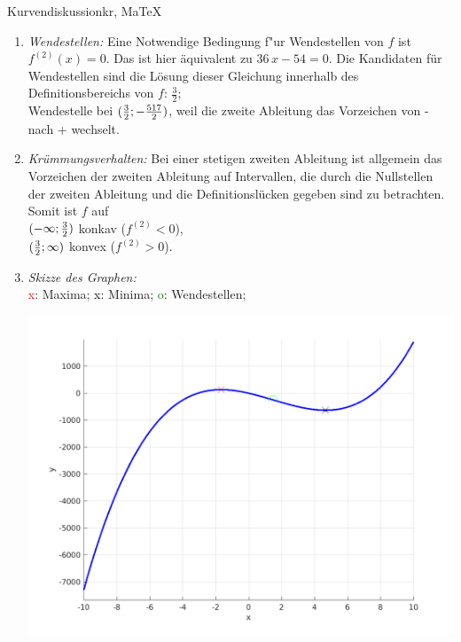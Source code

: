 \begin{MAufgabe}{Kurvendiskussion}{kr, MaTeX}
\begin{enumerate}
 $\MoIl-\infty\MIntvlSep- \frac{5}{3}\MoIr$ monoton wachsend, \\ 
 $\MoIl- \frac{5}{3}\MIntvlSep\frac{14}{3}\MoIr$ monoton  fallend, \\ 
 $\MoIl\frac{14}{3}\MIntvlSep \infty\MoIr$ monoton wachsend. \\ 
 \item \emph{Wendestellen:} 
 Eine Notwendige Bedingung f"ur Wendestellen von $f$ ist $f^{(2)}(x)=0$. 
 Das ist hier \"aquivalent zu $36\, x - 54=0$. 
 Die Kandidaten f\"ur Wendestellen sind die L\"osung dieser Gleichung innerhalb des Definitionsbereichs von $f$: $\frac{3}{2}$; \\ 
 Wendestelle bei $(\frac{3}{2};- \frac{517}{2})$, weil die zweite Ableitung das Vorzeichen von - nach + wechselt. \\ 
 \item \emph{Kr\"ummungsverhalten:} 
 Bei einer stetigen zweiten Ableitung ist allgemein das Vorzeichen der zweiten Ableitung auf Intervallen, die durch die Nullstellen der zweiten Ableitung und die Definitionsl\"ucken gegeben sind zu betrachten. 
 Somit ist $f$ auf \\ 
 $(-\infty ;\frac{3}{2})$  konkav ($f^{(2)}<0$), \\ 
 $(\frac{3}{2}; \infty)$  konvex ($f^{(2)}>0$). \\ 
 \item \emph{Skizze des Graphen:} \\ 
 {\textcolor{red} x}: Maxima; {\textcolor{black} x}: Minima; {\textcolor{green} o}: Wendestellen; 
  \begin{center}
  \includegraphics[width=0.8\linewidth]{Abb_zur_Ag_autogenerated_fractions_8.png} \end{center}
  
 \end{enumerate}
 \else\relax\fi
  \end{MAufgabe}